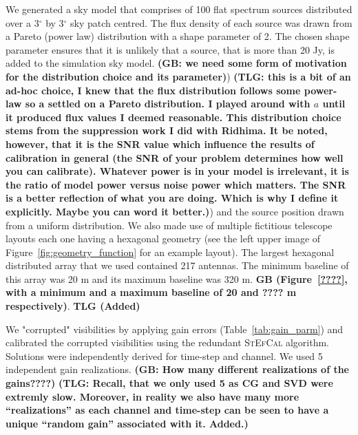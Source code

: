 \documentclass[useAMS,usenatbib]{mn2e}
\begin{document}
We generated a sky model that comprises of 100 flat spectrum sources distributed over a 3$^{\circ}$ by 3$^{\circ}$ sky 
patch centred. The flux density of each source was drawn from a Pareto (power law) distribution 
with a shape parameter of 2. The chosen shape parameter ensures that it is unlikely that a source, that is more than 20 Jy, is added to the simulation sky model. 
{\bf (GB: we need some form of motivation for the distribution choice and its parameter)}) 
{\bf (TLG: this is a bit of an ad-hoc choice, I knew that the flux distribution follows some power-law so a settled on a Pareto distribution. I played around 
with $a$ until it produced flux values I deemed reasonable. This distribution choice stems from the suppression work I did with Ridhima.
It be noted, however, that it is the SNR value which influence the results of calibration in general (the SNR of 
your problem determines how well you can calibrate). Whatever power is in your model is irrelevant, it 
is the ratio of model power versus noise power which matters. The SNR 
is a better reflection of what you are doing. Which is why I define it explicitly. Maybe you can word it better.)})
and the source position drawn from a uniform distribution. 
We also made use of multiple fictitious telescope layouts each one having a hexagonal geometry (see the left upper image of Figure~\ref{fig:geometry_function} for an example layout). The largest hexagonal distributed array 
that we used contained 217 antennas. The minimum baseline of this array was 20 m and its maximum baseline was 320 m.
{\bf GB (Figure~\ref{????}, with a minimum and a maximum baseline of 20 and ???? m respectively)}. 
{\bf TLG (Added)}

We "corrupted" visibilities by applying gain errors (Table~\ref{tab:gain_parm}) and calibrated the corrupted visibilities using the redundant \textsc{StEfCal} algorithm. Solutions were independently derived for time-step and channel. 
We used 5 independent gain realizations. {\bf (GB: How many different realizations of the gains????)}
{\bf (TLG: Recall, that we only used 5 as CG and SVD were extremly slow. Moreover, in reality we also have many more ``realizations'' as 
each channel and time-step can be seen to have a unique ``random gain'' associated with it. Added.)}
\end{document}
